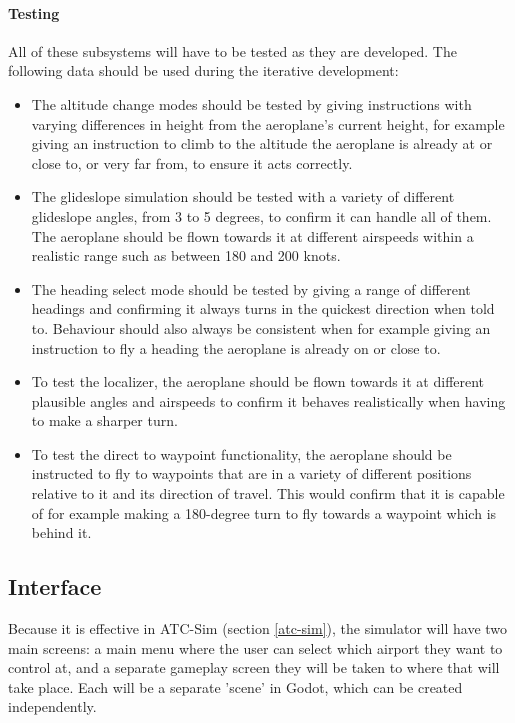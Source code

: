 \documentclass{article}
\begin{document}
\paragraph{Testing}
All of these subsystems will have to be tested as they are developed. The following data should be used during the iterative development:
\begin{itemize}
    \item The altitude change modes should be tested by giving instructions with varying differences in height from the aeroplane's current height, for example giving an instruction to climb to the altitude the aeroplane is already at or close to, or very far from, to ensure it acts correctly.
    \item The glideslope simulation should be tested with a variety of different glideslope angles, from 3 to 5 degrees, to confirm it can handle all of them.
    The aeroplane should be flown towards it at different airspeeds within a realistic range such as between 180 and 200 knots.
    \item The heading select mode should be tested by giving a range of different headings and confirming it always turns in the quickest direction when told to.
    Behaviour should also always be consistent when for example giving an instruction to fly a heading the aeroplane is already on or close to.
    \item To test the localizer, the aeroplane should be flown towards it at different plausible angles and airspeeds to confirm it behaves realistically when having to make a sharper turn.
    \item To test the direct to waypoint functionality, the aeroplane should be instructed to fly to waypoints that are in a variety of different positions relative to it and its direction of travel.
    This would confirm that it is capable of for example making a 180-degree turn to fly towards a waypoint which is behind it.
\end{itemize}


\subsection{Interface}
Because it is effective in ATC-Sim (section \ref{atc-sim}), the simulator will have two main screens: a main menu where the user can select which airport they want to control at, and a separate gameplay screen they will be taken to where that will take place.
Each will be a separate 'scene' in Godot, which can be created independently.
\end{document}
